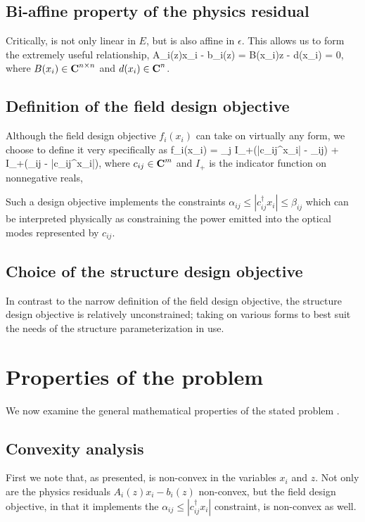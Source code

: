 \documentclass{book}
\newcommand{\T}{^\dagger}
\newcommand{\comps}{{\mbox{\bf C}}}
\begin{document}
\subsection{Bi-affine property of the physics residual}
Critically,  is not only linear in $E$,
    but is also affine in $\epsilon$.
This allows us to form the extremely useful relationship,
        {A_i(z)x_i - b_i(z) = B(x_i)z - d(x_i) = 0,}
    where $B(x_i) \in \comps^{n \times n}$ and $d(x_i) \in \comps^n$.
    

\subsection{Definition of the field design objective}
Although the field design objective $f_i(x_i)$ 
    can take on virtually any form,
    we choose to define it very specifically as
        {f_i(x_i) = \sum_j I_+(|c_{ij}\T x_i| - \alpha_{ij})
            + I_+(\beta_{ij} - |c_{ij}\T x_i|),}
    where $c_{ij} \in \comps^m$ and 
    $I_+$ is the indicator function on nonnegative reals,

Such a design objective implements the constraints 
    $\alpha_{ij} \le |c_{ij}\T x_i| \le \beta_{ij}$
    which can be interpreted physically as 
    constraining the power emitted into the optical modes
    represented by $c_{ij}$.

\subsection{Choice of the structure design objective}
In contrast to the narrow definition of the field design objective,
    the structure design objective is relatively unconstrained;
    taking on various forms to best suit the needs of
    the structure parameterization in use.

\section{Properties of the problem}
We now examine the general mathematical properties 
    of the stated problem .

\subsection{Convexity analysis}
First we note that, as presented, 
     is non-convex 
    in the variables $x_i$ and $z$. %
Not only are the physics residuals $A_i(z)x_i - b_i(z)$ non-convex,
    but the field design objective, in that it implements the 
    $ \alpha_{ij} \le |c_{ij}\T x_i| $ constraint, is non-convex as well.
\end{document}

